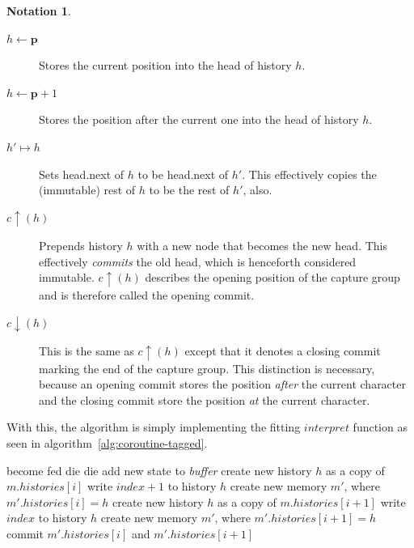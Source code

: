 \documentclass[11pt,a4paper,twoside,openright]{Thesis}
\theoremstyle{definition}
\newtheorem*{notation}{Notation}
\newcommand{\pos}{\mathbf{\mathbf{p}}}
\begin{document}
\begin{notation}
\begin{description}
\item [$h\leftarrow\pos$] Stores the current position into the head of history $h$.
\item [$h\leftarrow\pos+1$] Stores the position after the current one into the
  head of history $h$.
\item [$h'\mapsto h$] Sets head.next of $h$ to be head.next of $h'$.
	This effectively copies the (immutable) rest of $h$ to be the rest of $h'$, also.
\item [$c\uparrow(h)$] Prepends history $h$ with a new node that becomes the
  new head.  This effectively \emph{commits} the old head, which is henceforth
  considered immutable. $c\uparrow(h)$ describes the opening position of the
  capture group and is therefore called the opening commit.
\item [$c\downarrow(h)$] This is the same as $c\uparrow(h)$ except that it
  denotes a closing commit marking the end of the capture group.  This
  distinction is necessary, because an opening commit stores the position
  \emph{after} the current character and the closing commit store the
  position \emph{at} the current character.
\end{description}
\end{notation}

With this, the algorithm is simply implementing the fitting $interpret$
function as seen in algorithm~\ref{alg:coroutine-tagged}.

\begin{algorithm*}[htbp]
\begin{algorithmic}[1]
      \State become fed
      \Else
        \State die
      \EndIf
    \EndIf
        \State die
      \EndIf
      \State add new state to \emph{buffer}
    \EndIf
      \State create new history $h$ as a copy of $m.histories[i]$
      \State write $index+1$ to history $h$
      \State create new memory $m'$, where $m'.histories[i] = h$
    \EndIf
      \State create new history $h$ as a copy of $m.histories[i+1]$
      \State write $index$ to history $h$
      \State create new memory $m'$, where $m'.histories[i+1] = h$
      \State commit $m'.histories[i]$ and $m'.histories[i+1]$
    \EndIf
  \EndFunction
\end{algorithmic}
\label{alg:interpret}
\end{algorithm*}
\end{document}
